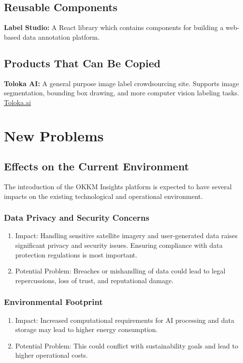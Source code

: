 \documentclass[12pt]{article}
\begin{document}
\subsection{Reusable Components}
\textbf{Label Studio: } A React library which contains components for building a web-based data annotation platform.
\subsection{Products That Can Be Copied}
\textbf{Toloka AI: } A general purpose image label crowdsourcing site. Supports image segmentation, bounding box drawing, and more computer vision labeling tasks. \href{https://toloka.ai/}{Toloka.ai}



\section{New Problems}
\subsection{Effects on the Current Environment}
The introduction of the OKKM Insights platform is expected to have several impacts on the existing technological and operational environment.
\subsubsection{Data Privacy and Security Concerns}
\begin{enumerate}
    \item Impact: Handling sensitive satellite imagery and user-generated data raises significant privacy and security issues. Ensuring compliance with data protection regulations is most important.
    \item Potential Problem: Breaches or mishandling of data could lead to legal repercussions, loss of trust, and reputational damage.
\end{enumerate}
\subsubsection{Environmental Footprint}
\begin{enumerate}
    \item Impact: Increased computational requirements for AI processing and data storage may lead to higher energy consumption.
    \item Potential Problem: This could conflict with sustainability goals and lead to higher operational costs.
\end{enumerate}
\end{document}
